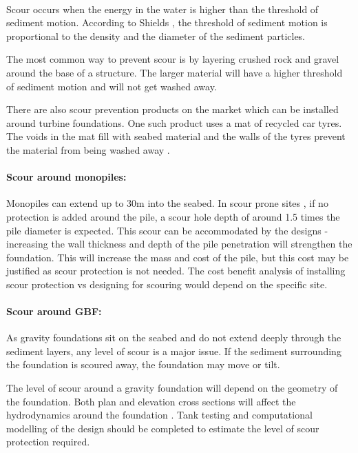 \documentclass[12pt]{article} %
\begin{document}
\paragraph{}
Scour occurs when the energy in the water is higher than the threshold of sediment motion.
According to Shields \cite{shields_application_1936}, the threshold of sediment motion is proportional to the density and the diameter of the sediment particles.

The most common way to prevent scour is by layering crushed rock and gravel around the base of a structure. The larger material will have a higher threshold of sediment motion and will not get washed away.

There are also scour prevention products on the market which can be installed around turbine foundations. One such product uses a mat of recycled car tyres. The voids in the mat fill with seabed material and the walls of the tyres prevent the material from being washed away \cite{tyres}.

\paragraph{Scour around monopiles:}
Monopiles can extend up to 30m into the seabed. In scour prone sites , if no protection is added around the pile, a scour hole depth of around 1.5 times the pile diameter is expected.
This scour can be accommodated by the designs - increasing the wall thickness and depth of the pile penetration will strengthen the foundation\cite{zaaijer}. This will increase the mass and cost of the pile, but this cost may be justified as scour protection is not needed. The cost benefit analysis of installing scour protection vs designing for scouring would depend on the specific site.

\paragraph{Scour around GBF:}
As gravity foundations sit on the seabed and do not extend deeply through the sediment layers, any level of scour is a major issue.
If the sediment surrounding the foundation is scoured away, the foundation may move or tilt.

The level of scour around a gravity foundation will depend on the geometry of the foundation. Both plan and elevation cross sections will affect the hydrodynamics around the foundation \cite{ruiz}. Tank testing and computational modelling of the design should be completed to estimate the level of scour protection required.
\end{document}
